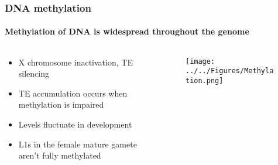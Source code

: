 \documentclass{beamer}
\begin{document}
		\begin{frame} %
			
			\frametitle{DNA methylation}
			\framesubtitle{Methylation of DNA is widespread throughout the genome}
			\begin{columns}
	
				\begin{column}{0.5\linewidth}
		
			\begin{itemize}
				\item X chromosome inactivation, TE silencing
				\item TE accumulation occurs when methylation is impaired
				\item Levels fluctuate in development
				\item L1s in the female mature gamete aren't fully methylated
			\end{itemize}
				\end{column}
				\begin{column}{0.5\linewidth}
					\begin{figure}
						\centering
						\texttt{[image: ../../Figures/Methylation.png]}
					\end{figure}
				\end{column}
			\end{columns}
		\end{frame}		
		
\end{document}
